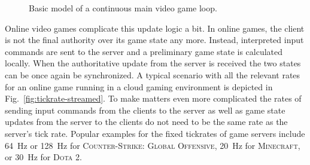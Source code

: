 
\begin{figure}[!t]
\centering
\removelatexerror
\begin{algorithm}[H]
\end{algorithm}
\caption{Basic model of a continuous main video game loop.}
\label{alg:gameloop1}
\end{figure}

Online video games complicate this update logic a bit. In online games, the client is not the final authority over its game state any more. Instead, interpreted input commands are sent to the server and a preliminary game state is calculated locally. When the authoritative update from the server is received the two states can be once again be synchronized. A typical scenario with all the relevant rates for an online game running in a cloud gaming environment is depicted in Fig.~\ref{fig:tickrate-streamed}. To make matters even more complicated the rates of sending input commands from the clients to the server as well as game state updates from the server to the clients do not need to be the same rate as the server's tick rate. Popular examples for the fixed tickrates of game servers include \SI{64}{\hertz} or \SI{128}{\hertz} for \textsc{Counter-Strike: Global Offensive}, \SI{20}{\hertz} for \textsc{Minecraft}, or \SI{30}{\hertz} for \textsc{Dota 2}.

